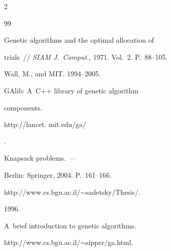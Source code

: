  \begin{multicols}{2}





\renewcommand{\bibname}{\protect\rmfamily Литература}







{\small\frenchspacing


{%


\begin{thebibliography}{99}









Genetic algorithms and the optimal allocation of


trials~// \textit{SIAM J.~Comput.}, 1971. Vol.~2. P.~88--105.







Wall, M., and MIT. 1994--2005.


GAlib: A~C++ library of genetic algorithm


components. {\sf


http://lancet. mit.edu/ga/}.












{Knapsack problems}.~---


Berlin: Springer, 2004. P.~161--166.







{\sf http://www.cs.bgu.ac.il/$\sim$sadetsky/Thesis/}.







  1996.


A~brief introduction to genetic algorithms.


{\sf http://www.cs.bgu.ac.il/$\sim$sipper/ga.html}.






\end{thebibliography}}}
\end{multicols}
